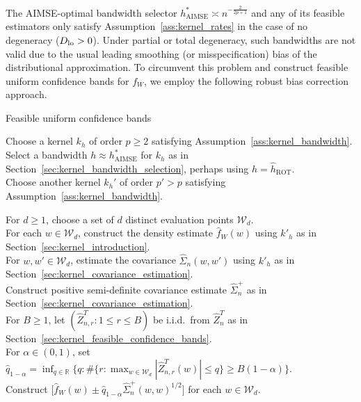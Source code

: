 \documentclass[11pt,lof]{puthesis}
\newcommand{\R}{\ensuremath{\mathbb{R}}}
\newcommand{\cW}{\ensuremath{\mathcal{W}}}
\newcommand{\Dl}{\ensuremath{D_{\textup{lo}}}}
\DeclareMathOperator{\AIMSE}{AIMSE}
\DeclareMathOperator{\ROT}{ROT}
\theoremstyle{break}
\theoremstyle{proof}
\begin{document}
The AIMSE-optimal bandwidth selector $h^*_{\AIMSE}\asymp n^{-\frac{2}{2p+1}}$
and any of its feasible estimators only satisfy
Assumption~\ref{ass:kernel_rates} in
the case of no degeneracy ($\Dl>0$). Under partial or total degeneracy, such
bandwidths are not valid due to the usual leading smoothing (or
misspecification) bias of the distributional approximation. To circumvent this
problem and construct feasible uniform confidence bands for $f_W$, we employ
the following robust bias correction approach.

\begin{algorithm}[b!]
  \caption{Feasible uniform confidence bands}
  \label{alg:kernel_method}

  Choose a kernel $k_h$ of order $p \geq 2$ satisfying
  Assumption~\ref{ass:kernel_bandwidth}. \\

  Select a bandwidth $h \approx h^*_{\AIMSE}$ for $k_h$
  as in Section~\ref{sec:kernel_bandwidth_selection},
  perhaps using $h = \hat{h}_{\ROT}$. \\

  Choose another kernel $k_h'$ of order $p'>p$ satisfying
  Assumption~\ref{ass:kernel_bandwidth}.

  For $d \geq 1$, choose a set of $d$ distinct evaluation points $\cW_d$. \\

  For each $w \in \cW_d$, construct the density estimate $\hat f_W(w)$
  using $k'_{h}$ as in Section~\ref{sec:kernel_introduction}. \\

  For $w, w' \in \cW_d$, estimate the covariance $\hat \Sigma_n(w,w')$
  using $k'_{h}$ as in Section~\ref{sec:kernel_covariance_estimation}. \\

  Construct positive semi-definite
  covariance estimate $\hat \Sigma_n^+$
  as in Section~\ref{sec:kernel_covariance_estimation}. \\

  For $B \geq 1$, let $(\hat Z_{n,r}^T: 1\leq r\leq B)$ be i.i.d.\
  from $\hat{Z}_n^T$ as in Section~\ref{sec:kernel_feasible_confidence_bands}.
  \\

  For $\alpha \in (0,1)$, set
  $\hat q_{1-\alpha} = \inf_{q \in \R}
  \{ q : \# \{r: \max_{w\in\cW_d}|\hat Z_{n,r}^T(w)| \leq q \}
  \geq B(1-\alpha) \}$. \\

  Construct $ \big[\hat f_W(w) \pm
  \hat q_{1-\alpha} \hat\Sigma_n^+(w,w)^{1/2} \big]$ for each $w \in \cW_d$.
\end{algorithm}
\end{document}
